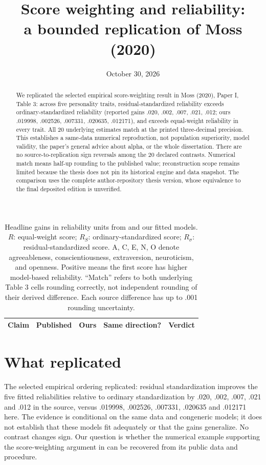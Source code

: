 
\newcommand{\file}[2]{\href{https://github.com/alectionary/vibe-math/blob/master/formalization/moss-score-reliability/#1}{\nolinkurl{#2}}}
\title{Score weighting and reliability:\\a bounded replication of Moss (2020)}
\date{October 30, 2026}

\maketitle
\begin{abstract}
We replicated the selected empirical score-weighting result in Moss (2020), Paper I, Table 3: across five personality traits, residual-standardized reliability exceeds ordinary-standardized reliability (reported gains .020, .002, .007, .021, .012; ours .019998, .002526, .007331, .020635, .012171), and exceeds equal-weight reliability in every trait. All 20 underlying estimates match at the printed three-decimal precision. This establishes a same-data numerical reproduction, not population superiority, model validity, the paper's general advice about alpha, or the whole dissertation. There are no source-to-replication sign reversals among the 20 declared contrasts. Numerical match means half-up rounding to the published value; reconstruction scope remains limited because the thesis does not pin its historical engine and data snapshot. The comparison uses the complete author-repository thesis version, whose equivalence to the final deposited edition is unverified.
\end{abstract}
\begin{table}[h!]
\centering
\begin{tabular}{lrrll}\toprule
Claim & Published & Ours & Same direction? & Verdict\\\midrule

\end{tabular}
\caption{Headline gains in reliability units from \citet[Paper I, Table 3, p.19]{moss} and our fitted models. $R$: equal-weight score; $R_S$: ordinary-standardized score; $R_\sigma$: residual-standardized score. A, C, E, N, O denote agreeableness, conscientiousness, extraversion, neuroticism, and openness. Positive means the first score has higher model-based reliability. ``Match'' refers to both underlying Table 3 cells rounding correctly, not independent rounding of their derived difference. Each source difference has up to .001 rounding uncertainty.}
\end{table}
\section{What replicated}
The selected empirical ordering replicated: residual standardization improves the five fitted reliabilities relative to ordinary standardization by .020, .002, .007, .021 and .012 in the source, versus .019998, .002526, .007331, .020635 and .012171 here. The evidence is conditional on the same data and congeneric models; it does not establish that these models fit adequately or that the gains generalize. No contrast changes sign. Our question is whether the numerical example supporting the score-weighting argument in \citet[Paper I, Example 11]{moss} can be recovered from its public data and procedure.

